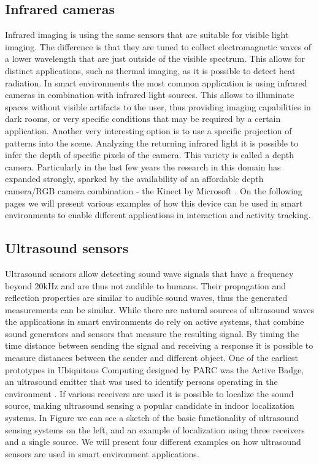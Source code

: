 \subsection{Infrared cameras}
Infrared imaging is using the same sensors that are suitable for visible light imaging. The difference is that they are tuned to collect electromagnetic waves of a lower wavelength that are just outside of the visible spectrum. This allows for distinct applications, such as thermal imaging, as it is possible to  detect heat radiation. In smart environments the most common application is using infrared cameras in combination with infrared light sources. This allows to illuminate spaces without visible artifacts to the user, thus providing imaging capabilities in dark rooms, or very specific conditions that may be required by a certain application. Another very interesting option is to use a specific projection of patterns into the scene. Analyzing the returning infrared light it is possible to infer the depth of specific pixels of the camera. This variety is called a depth camera. Particularly in the last few years the research in this domain has expanded strongly, sparked by the availability of an affordable depth camera/RGB camera combination - the Kinect by Microsoft \cite{zhang2012microsoft}. On the following pages we will present various examples of how this device can be used in smart environments to enable different applications in interaction and activity tracking.

\cite{beck2013immersive}

\cite{panger2012kinect}

\cite{sung2011human}

\cite{Izadi2011}
\subsection{Ultrasound sensors}
Ultrasound sensors allow detecting sound wave signals that have a frequency beyond 20kHz and are thus not audible to humans. Their propagation and reflection properties are similar to audible sound waves, thus the generated measurements can be similar. While there are natural sources of ultrasound waves the applications in smart environments do rely on active systems, that combine sound generators and sensors that measure the resulting signal. By timing the time distance between sending the signal and receiving a response it is possible to measure distances between the sender and different object. One of the earliest prototypes in Ubiquitous Computing designed by PARC was the Active Badge, an ultrasound emitter that was used to identify persons operating in the environment \cite{Weiser1991}. If various receivers are used it is possible to localize the sound source, making ultrasound sensing a popular candidate in indoor localization systems. In Figure we can see a sketch of the basic functionality of ultrasound sensing systems on the left, and an example of localization using three receivers and a single source. We will present four different examples on how ultrasound sensors are used in smart environment applications.
\cite{dutta2005utilization}

